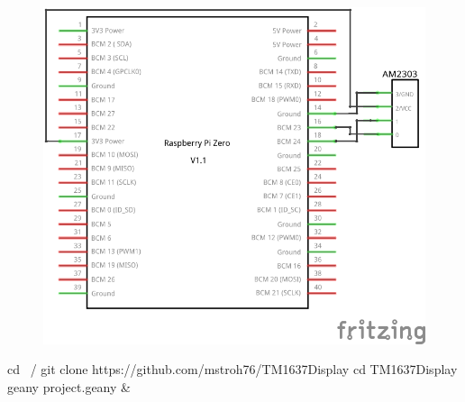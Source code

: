 \begin{figure}[ht]
	\centering
	\includegraphics[scale=0.25]{images/TM1637_Schaltplan.png}	
	\label{TM1637}
\end{figure}


\begin{console}
cd ~/
git clone https://github.com/mstroh76/TM1637Display
cd TM1637Display
geany project.geany & 
\end{console}


